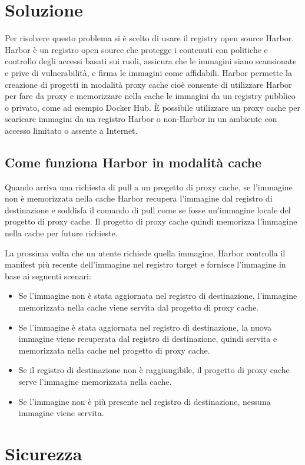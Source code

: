 \documentclass[12pt,a4paper]{report}
\begin{document}
\chapter{Soluzione}
Per risolvere questo problema si è scelto di usare il registry open source Harbor. Harbor è un registro open source che protegge i contenuti con politiche e controllo degli accessi basati sui ruoli, assicura che le immagini siano scansionate e prive di vulnerabilità, e firma le immagini come affidabili. Harbor permette la creazione di progetti in modalità proxy cache cioè consente di utilizzare Harbor per fare da proxy e memorizzare nella cache le immagini da un registry pubblico o privato, come ad esempio Docker Hub. È possibile utilizzare un proxy cache per scaricare immagini da un registro Harbor o non-Harbor in un ambiente con accesso limitato o assente a Internet.
\section{Come funziona Harbor in modalità cache}
Quando arriva una richiesta di pull a un progetto di proxy cache, se l'immagine non è memorizzata nella cache Harbor recupera l'immagine dal registro di destinazione e soddisfa il comando di pull come se fosse un'immagine locale del progetto di proxy cache. Il progetto di proxy cache quindi memorizza l'immagine nella cache per future richieste.

La prossima volta che un utente richiede quella immagine, Harbor controlla il manifest più recente dell'immagine nel registro target e fornisce l'immagine in base ai seguenti scenari:
\begin{itemize}
    \item Se l'immagine non è stata aggiornata nel registro di destinazione, l'immagine memorizzata nella cache viene servita dal progetto di proxy cache.
    \item Se l'immagine è stata aggiornata nel registro di destinazione, la nuova immagine viene recuperata dal registro di destinazione, quindi servita e memorizzata nella cache nel progetto di proxy cache.
    \item Se il registro di destinazione non è raggiungibile, il progetto di proxy cache serve l'immagine memorizzata nella cache.
    \item Se l'immagine non è più presente nel registro di destinazione, nessuna immagine viene servita. 
\end{itemize}

\chapter{Sicurezza}
\end{document}
